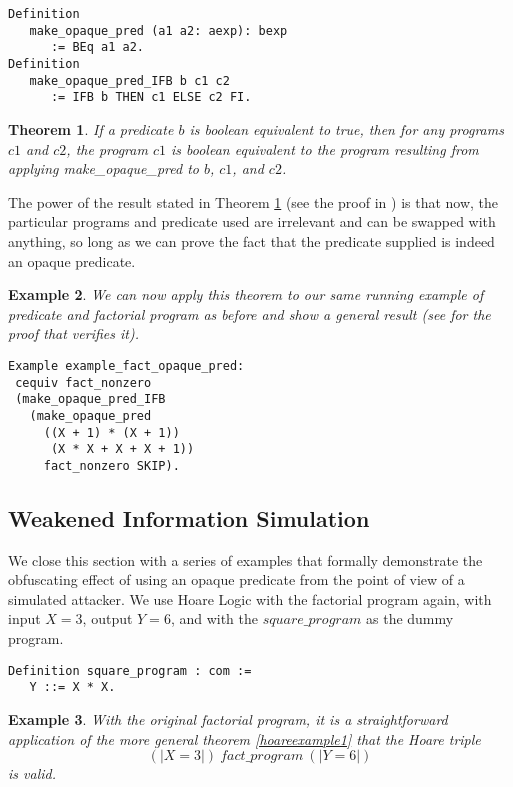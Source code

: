 \documentclass[compsoc,conference,a4paper,10pt,times]{IEEEtran}
\newtheorem{theorem}{Theorem}[section]
\newtheorem{example}[theorem]{Example}
\begin{document}
\begin{verbatim}
Definition 
   make_opaque_pred (a1 a2: aexp): bexp 
      := BEq a1 a2.
Definition 
   make_opaque_pred_IFB b c1 c2 
      := IFB b THEN c1 ELSE c2 FI.
\end{verbatim}

\begin{theorem}\label{generalcequiv}
If a predicate $b$ is boolean equivalent to true, then for any programs $c1$ and $c2$,
the program $c1$ is boolean equivalent to the program resulting from applying make\_opaque\_pred
to $b$, $c1$, and $c2$. 
\end{theorem}

The power of the result stated in Theorem \ref{generalcequiv} (see the proof in \cite{Weyun}) is that now, the particular programs and predicate used are irrelevant and can be swapped with anything, so long as we can prove the fact that the predicate supplied is indeed an opaque predicate. 

\begin{example}\label{factopaqueex}
We can now apply this theorem to our same running example of predicate and factorial program as before and show a general result (see \cite{Weyun} for the proof that verifies it).
\begin{verbatim}
Example example_fact_opaque_pred: 
 cequiv fact_nonzero 
 (make_opaque_pred_IFB 
   (make_opaque_pred 
     ((X + 1) * (X + 1)) 
      (X * X + X + X + 1)) 
     fact_nonzero SKIP).
\end{verbatim}
\end{example}


\subsection{Weakened Information Simulation}\label{weakened}

We close this section with a series of examples that formally demonstrate the obfuscating effect of using an opaque predicate from the point of view of a simulated attacker.  We use Hoare Logic with the factorial program again, with input $X=3$, output $Y=6$, and with the $square\_program$ as the dummy program.

\begin{verbatim}
Definition square_program : com := 
   Y ::= X * X.
\end{verbatim}

\begin{example}\label{hoare21}
    With the original factorial program, it is a straightforward application of the more general theorem \ref{hoareexample1} that the Hoare triple \[(|X=3|)\ fact\_program\ (|Y=6|)\] is valid.
\end{example}
\end{document}
